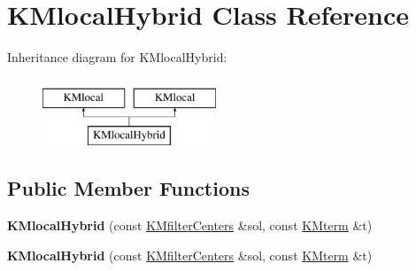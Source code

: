 \hypertarget{class_k_mlocal_hybrid}{
\section{KMlocalHybrid Class Reference}
\label{class_k_mlocal_hybrid}
}
Inheritance diagram for KMlocalHybrid:\begin{figure}[H]
\begin{center}
\leavevmode
\includegraphics[height=2cm]{class_k_mlocal_hybrid}
\end{center}
\end{figure}
\subsection*{Public Member Functions}
\begin{DoxyCompactItemize}
\item 
\hypertarget{class_k_mlocal_hybrid_a045b899c97395d5e45a7161686490caa}{
{\bfseries KMlocalHybrid} (const \hyperlink{class_k_mfilter_centers}{KMfilterCenters} \&sol, const \hyperlink{class_k_mterm}{KMterm} \&t)}
\label{class_k_mlocal_hybrid_a045b899c97395d5e45a7161686490caa}

\item 
\hypertarget{class_k_mlocal_hybrid_a045b899c97395d5e45a7161686490caa}{
{\bfseries KMlocalHybrid} (const \hyperlink{class_k_mfilter_centers}{KMfilterCenters} \&sol, const \hyperlink{class_k_mterm}{KMterm} \&t)}
\label{class_k_mlocal_hybrid_a045b899c97395d5e45a7161686490caa}

\end{DoxyCompactItemize}
